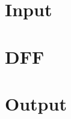 \section{Input}
\label{lst:input}


\section{DFF}
\label{lst:dff}


\section{Output}
\label{lst:output}

\newpage

